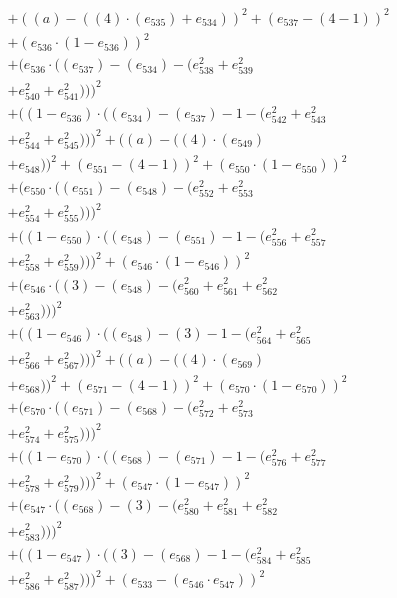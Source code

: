 \documentclass[10pt, a4paper]{article}
\begin{document}
\begin{small}
\begin{align*}
& + ((a) - ((4)  \cdot  (e_{535}) + e_{534}))^{2} + (e_{537} - (4 - 1))^{2} \\
& + (e_{536}  \cdot  (1 - e_{536}))^{2} \\
& + (e_{536}  \cdot  ((e_{537}) - (e_{534}) - (e_{538}^{2} + e_{539}^{2} \\
& + e_{540}^{2} + e_{541}^{2})))^{2} \\
& + ((1 - e_{536})  \cdot  ((e_{534}) - (e_{537}) - 1 - (e_{542}^{2} + e_{543}^{2} \\
& + e_{544}^{2} + e_{545}^{2})))^{2} + ((a) - ((4)  \cdot  (e_{549}) \\
& + e_{548}))^{2} + (e_{551} - (4 - 1))^{2} + (e_{550}  \cdot  (1 - e_{550}))^{2} \\
& + (e_{550}  \cdot  ((e_{551}) - (e_{548}) - (e_{552}^{2} + e_{553}^{2} \\
& + e_{554}^{2} + e_{555}^{2})))^{2} \\
& + ((1 - e_{550})  \cdot  ((e_{548}) - (e_{551}) - 1 - (e_{556}^{2} + e_{557}^{2} \\
& + e_{558}^{2} + e_{559}^{2})))^{2} + (e_{546}  \cdot  (1 - e_{546}))^{2} \\
& + (e_{546}  \cdot  ((3) - (e_{548}) - (e_{560}^{2} + e_{561}^{2} + e_{562}^{2} \\
& + e_{563}^{2})))^{2} \\
& + ((1 - e_{546})  \cdot  ((e_{548}) - (3) - 1 - (e_{564}^{2} + e_{565}^{2} \\
& + e_{566}^{2} + e_{567}^{2})))^{2} + ((a) - ((4)  \cdot  (e_{569}) \\
& + e_{568}))^{2} + (e_{571} - (4 - 1))^{2} + (e_{570}  \cdot  (1 - e_{570}))^{2} \\
& + (e_{570}  \cdot  ((e_{571}) - (e_{568}) - (e_{572}^{2} + e_{573}^{2} \\
& + e_{574}^{2} + e_{575}^{2})))^{2} \\
& + ((1 - e_{570})  \cdot  ((e_{568}) - (e_{571}) - 1 - (e_{576}^{2} + e_{577}^{2} \\
& + e_{578}^{2} + e_{579}^{2})))^{2} + (e_{547}  \cdot  (1 - e_{547}))^{2} \\
& + (e_{547}  \cdot  ((e_{568}) - (3) - (e_{580}^{2} + e_{581}^{2} + e_{582}^{2} \\
& + e_{583}^{2})))^{2} \\
& + ((1 - e_{547})  \cdot  ((3) - (e_{568}) - 1 - (e_{584}^{2} + e_{585}^{2} \\
& + e_{586}^{2} + e_{587}^{2})))^{2} + (e_{533} - (e_{546}  \cdot  e_{547}))^{2} \\

\end{align*}
\end{small}
\end{document}
